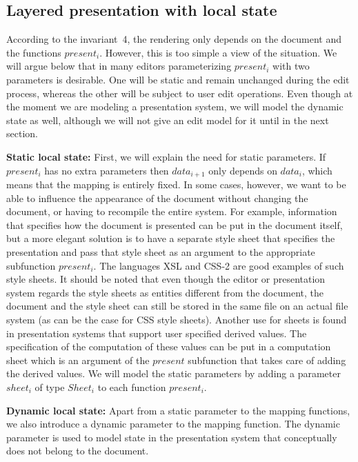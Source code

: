 \documentclass[twoside,epsf]{report}
\begin{document}
\subsection{Layered presentation with local state}


According to the invariant~4, the rendering only depends on the document and the functions $present_i$. However, this is too simple a view of the situation. We will argue below that in many editors parameterizing $present_i$ with two parameters is desirable. One will be static and remain unchanged during the edit process, whereas the other will be subject to user edit operations. Even though at the moment we are modeling a presentation system, we will model the dynamic state as well, although we will not give an edit model for it until in the next section.

{\bf Static local state:} First, we will explain the need for static parameters. If $present_i$ has no extra parameters then $data_{i+1}$ only depends on $data_i$, which means that the mapping is entirely fixed. In some cases, however, we want to be able to influence the appearance of the document without changing the document, or having to recompile the entire system. For example, information that specifies how the document is presented can be put in the document itself, but a more elegant solution is to have a separate style sheet that specifies the presentation and pass that style sheet as an argument to the appropriate subfunction $present_i$. The languages XSL\cite{xsl} and CSS-2\cite{css} are good examples of such style sheets. It should be noted that even though the editor or presentation system regards the style sheets as entities different from the document, the document and the style sheet can still be stored in the same file on an actual file system (as can be the case for CSS style sheets). Another use for sheets is found in presentation systems that support user specified derived values. The specification of the computation of these values can be put in a computation sheet which is an argument of the $present$ subfunction that takes care of adding the derived values. We will model the static parameters by adding a parameter $sheet_{i}$ of type $Sheet_i$ to each function $present_i$.

{\bf Dynamic local state:} Apart from a static parameter to the mapping functions, we also introduce a dynamic parameter to the mapping function. The dynamic parameter is used to model state in the presentation system that conceptually does not belong to the document. 
\end{document}
